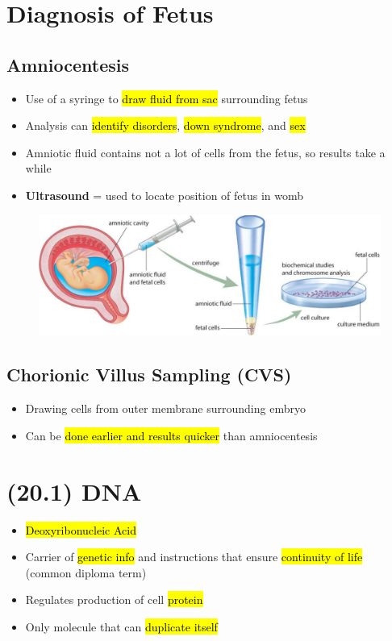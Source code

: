 \documentclass[a4paper,12pt]{article}
\begin{document}
\section{Diagnosis of Fetus}

\subsection{Amniocentesis}
\begin{itemize}
    \item{Use of a syringe to \hl{draw fluid from sac} surrounding fetus}
    \item{Analysis can \hl{identify disorders}, \hl{down syndrome}, and \hl{sex}}
    \item{Amniotic fluid contains not a lot of cells from the fetus, so results take a while}
    \item{\textbf{Ultrasound} = used to locate position of fetus in womb}
\end{itemize}

\begin{figure}[H]
    \centering
    \includegraphics[width=\textwidth]{amnio}
\end{figure}

\subsection{Chorionic Villus Sampling (CVS)}
\begin{itemize}
    \item{Drawing cells from outer membrane surrounding embryo}
    \item{Can be \hl{done earlier and results quicker} than amniocentesis}
\end{itemize}

\pagebreak

\section{(20.1) DNA}
\begin{itemize}
    \item{\hl{Deoxyribonucleic Acid}}
    \item{Carrier of \hl{genetic info} and instructions that ensure \hl{continuity of life} \\ (common diploma term)}
    \item{Regulates production of cell \hl{protein}}
    \item{Only molecule that can \hl{duplicate itself}}
\end{itemize}
\end{document}
